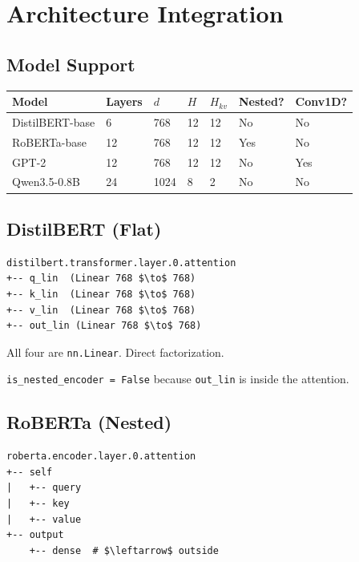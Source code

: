 
\section{Architecture Integration}

\subsection{Model Support}

\begin{table}[H]
\centering
\small
\begin{tabular}{lllllll}
\toprule
\textbf{Model} & \textbf{Layers} & \textbf{$d$} & \textbf{$H$} & \textbf{$H_{kv}$} & \textbf{Nested?} & \textbf{Conv1D?} \\
\midrule
DistilBERT-base & 6 & 768 & 12 & 12 & No & No \\
RoBERTa-base & 12 & 768 & 12 & 12 & Yes & No \\
GPT-2 & 12 & 768 & 12 & 12 & No & Yes \\
Qwen3.5-0.8B & 24 & 1024 & 8 & 2 & No & No \\
\bottomrule
\end{tabular}
\end{table}

\subsection{DistilBERT (Flat)}

\begin{lstlisting}
distilbert.transformer.layer.0.attention
+-- q_lin  (Linear 768 $\to$ 768)
+-- k_lin  (Linear 768 $\to$ 768)
+-- v_lin  (Linear 768 $\to$ 768)
+-- out_lin (Linear 768 $\to$ 768)
\end{lstlisting}

All four are \texttt{nn.Linear}. Direct factorization.

\texttt{is\_nested\_encoder = False} because \texttt{out\_lin} is inside the attention.

\subsection{RoBERTa (Nested)}

\begin{lstlisting}
roberta.encoder.layer.0.attention
+-- self
|   +-- query
|   +-- key
|   +-- value
+-- output
    +-- dense  # $\leftarrow$ outside
\end{lstlisting}

